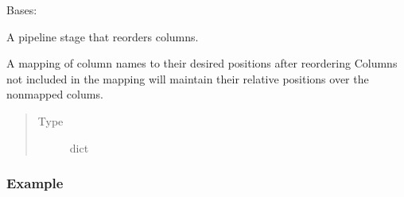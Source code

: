 \documentclass[letterpaper,10pt,english]{sphinxmanual}
\begin{document}
\begin{fulllineitems}
\begin{fulllineitems}
\begin{quote}
\begin{description}
\end{description}\end{quote}

\end{fulllineitems}


\end{fulllineitems}


\begin{fulllineitems}
\label{\detokenize{dalio.pipe:dalio.pipe.select.ColReorder}}
Bases: 

A pipeline stage that reorders columns.

\begin{fulllineitems}
\label{\detokenize{dalio.pipe:dalio.pipe.select.ColReorder.positions}}
A mapping of column names to their desired positions
after reordering Columns not included in the mapping will maintain
their relative positions over the non\sphinxhyphen{}mapped colums.
\begin{quote}\begin{description}
\item[{Type}] \leavevmode
dict

\end{description}\end{quote}

\end{fulllineitems}

\subsubsection*{Example}


\end{fulllineitems}
\end{document}
